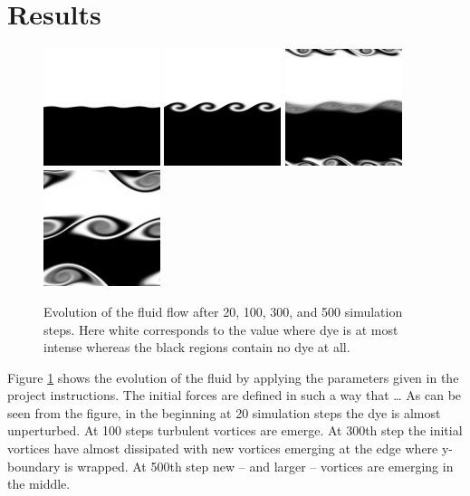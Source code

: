 \documentclass[12pt, letterpaper]{article}
\begin{document}
\section{Results}
\begin{figure}[h!]
  \center
  \includegraphics[width=9.2em]{run/images/20_steps.png}
  \includegraphics[width=9.2em]{run/images/100_steps.png}
  \includegraphics[width=9.2em]{run/images/300_steps.png}
  \includegraphics[width=9.2em]{run/images/500_steps.png}
  \caption{Evolution of the fluid flow after 20, 100, 300, and 500 simulation steps.
  Here white corresponds to the value where dye is at most intense whereas the black regions contain no dye at all.}
  \label{result}
\end{figure}
Figure \ref{result} shows the evolution of the fluid by applying the parameters given in the project instructions.
The initial forces are defined in such a way that \dots
As can be seen from the figure, in the beginning at 20 simulation steps the dye is almost unperturbed.
At 100 steps turbulent vortices are emerge.
At 300th step the initial vortices have almost dissipated with new vortices emerging at the edge where y-boundary is wrapped.
At 500th step new -- and larger -- vortices are emerging in the middle.
\end{document}
